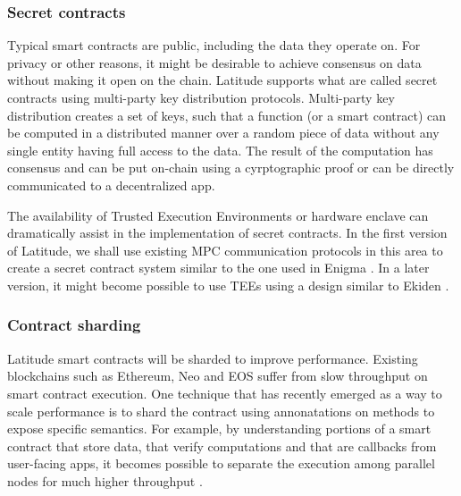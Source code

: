 \subsubsection{Secret contracts}

Typical smart contracts are public, including the data they operate on. For privacy or other reasons, it might be
desirable to achieve consensus on data without making it open on the chain. Latitude supports what are called secret
contracts using multi-party key distribution protocols. Multi-party key distribution creates a set of keys, such that a
function (or a smart contract) can be computed in a distributed manner over a random piece of data without any single
entity having full access to the data. The result of the computation has consensus and can be put on-chain using a
cyrptographic proof or can be directly communicated to a decentralized  app.

The availability of Trusted Execution Environments or hardware enclave can dramatically assist in the implementation of
secret contracts. In the first version of Latitude, we shall use existing MPC communication protocols in this area to
create a secret contract system similar to the one used in Enigma \cite{enigma}. In a later version, it might become
possible to use TEEs using a design similar to Ekiden \cite{ekiden}.



\subsubsection{Contract sharding}

Latitude smart contracts will be sharded to improve performance. Existing blockchains such as Ethereum, Neo and EOS
suffer from slow throughput on smart contract execution. One technique that has recently emerged as a way to scale
performance is to shard the contract using annonatations on methods to expose specific semantics. For example, by
understanding portions of a smart contract that store data, that verify computations and that are callbacks from
user-facing apps, it becomes possible to separate the execution among parallel nodes for much higher throughput
\cite{chainspace}. 

